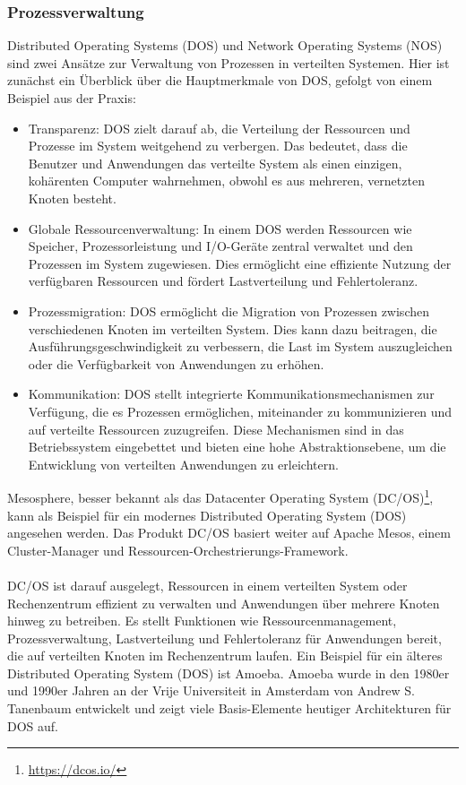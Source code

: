 \documentclass[../vs-script-first-v01.tex]{subfiles}
\begin{document}
\subsubsection{Prozessverwaltung}
Distributed Operating Systems (DOS) und Network Operating Systems (NOS) sind zwei Ansätze zur Verwaltung von Prozessen in verteilten Systemen. Hier ist zunächst ein Überblick über die Hauptmerkmale von DOS, gefolgt von einem Beispiel aus der Praxis:
\begin{itemize}
\item Transparenz: DOS zielt darauf ab, die Verteilung der Ressourcen und Prozesse im System weitgehend zu verbergen. Das bedeutet, dass die Benutzer und Anwendungen das verteilte System als einen einzigen, kohärenten Computer wahrnehmen, obwohl es aus mehreren, vernetzten Knoten besteht.
\item Globale Ressourcenverwaltung: In einem DOS werden Ressourcen wie Speicher, Prozessorleistung und I/O-Geräte zentral verwaltet und den Prozessen im System zugewiesen. Dies ermöglicht eine effiziente Nutzung der verfügbaren Ressourcen und fördert Lastverteilung und Fehlertoleranz.
\item Prozessmigration: DOS ermöglicht die Migration von Prozessen zwischen verschiedenen Knoten im verteilten System. Dies kann dazu beitragen, die Ausführungsgeschwindigkeit zu verbessern, die Last im System auszugleichen oder die Verfügbarkeit von Anwendungen zu erhöhen.
\item Kommunikation: DOS stellt integrierte Kommunikationsmechanismen zur Verfügung, die es Prozessen ermöglichen, miteinander zu kommunizieren und auf verteilte Ressourcen zuzugreifen. Diese Mechanismen sind in das Betriebssystem eingebettet und bieten eine hohe Abstraktionsebene, um die Entwicklung von verteilten Anwendungen zu erleichtern.
\end{itemize}
Mesosphere, besser bekannt als das Datacenter Operating System (DC/OS)\footnote{\url{https://dcos.io/}}, kann als Beispiel für ein modernes Distributed Operating System (DOS) angesehen werden. Das Produkt DC/OS basiert weiter auf Apache Mesos, einem Cluster-Manager und Ressourcen-Orchestrierungs-Framework.
\\\\
DC/OS ist darauf ausgelegt, Ressourcen in einem verteilten System oder Rechenzentrum effizient zu verwalten und Anwendungen über mehrere Knoten hinweg zu betreiben. Es stellt Funktionen wie Ressourcenmanagement, Prozessverwaltung, Lastverteilung und Fehlertoleranz für Anwendungen bereit, die auf verteilten Knoten im Rechenzentrum laufen. Ein Beispiel für ein  älteres Distributed Operating System (DOS) ist Amoeba. Amoeba wurde in den 1980er und 1990er Jahren an der Vrije Universiteit in Amsterdam von Andrew S. Tanenbaum entwickelt und zeigt viele Basis-Elemente heutiger Architekturen für DOS auf. 
\end{document}
